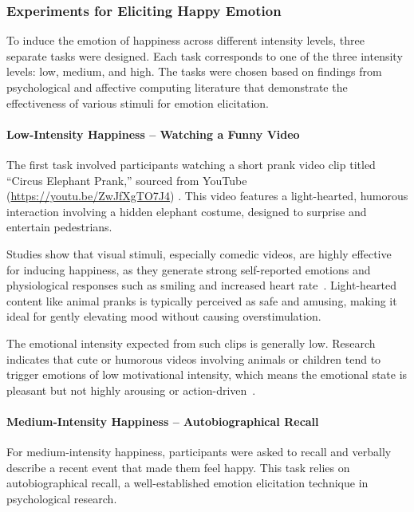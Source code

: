 \subsubsection{Experiments for Eliciting Happy Emotion}

To induce the emotion of happiness across different intensity levels, three separate tasks were designed. Each task corresponds to one of the three intensity levels: low, medium, and high. The tasks were chosen based on findings from psychological and affective computing literature that demonstrate the effectiveness of various stimuli for emotion elicitation.

\paragraph*{Low-Intensity Happiness – Watching a Funny Video}

The first task involved participants watching a short prank video clip titled “Circus Elephant Prank,” sourced from YouTube (\url{https://youtu.be/ZwJfXgTO7J4}) \citep{jls_pink_elephant}. This video features a light-hearted, humorous interaction involving a hidden elephant costume, designed to surprise and entertain pedestrians.

Studies show that visual stimuli, especially comedic videos, are highly effective for inducing happiness, as they generate strong self-reported emotions and physiological responses such as smiling and increased heart rate~\citep{emotionElictingsiedlecka2019}. Light-hearted content like animal pranks is typically perceived as safe and amusing, making it ideal for gently elevating mood without causing overstimulation.

The emotional intensity expected from such clips is generally low. Research indicates that cute or humorous videos involving animals or children tend to trigger emotions of low motivational intensity, which means the emotional state is pleasant but not highly arousing or action-driven~\citep{wang2022laugh}.

\paragraph*{Medium-Intensity Happiness – Autobiographical Recall}

For medium-intensity happiness, participants were asked to recall and verbally describe a recent event that made them feel happy. This task relies on autobiographical recall, a well-established emotion elicitation technique in psychological research.

